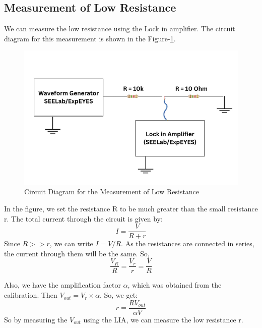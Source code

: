 \documentclass{article}
\begin{document}
\begin{multicols}{2}
\subsection{Measurement of Low Resistance}
We can measure the low resistance using the Lock in amplifier. The circuit diagram for this measurement is shown in the Figure-\ref{circuit_LR}. 



\begin{figure}[H]
    \centering
    \includegraphics[width=\columnwidth]{Images/circuit_LR.png}
    \caption{Circuit Diagram for the Measurement of Low Resistance}
    \label{circuit_LR}
\end{figure}

In the figure, we set the resistance R to be much greater than the small resistance r. The total current through the circuit is given by:
\begin{equation}
    I = \frac{V}{R+r}
\end{equation}
Since $R>>r$, we can write $I=V/R$. As the resistances are connected in series, the current through them will be the same. So,
\begin{equation}
    \frac{V_R}{R} = \frac{V_r}{r} = \frac{V}{R}
\end{equation}


Also, we have the amplification factor $\alpha$, which was obtained from the calibration. Then $V_{out}=V_r \times \alpha$. So, we get:
\begin{equation}
    r = \frac{RV_{out}}{\alpha V}
    \label{LR_eqn}
\end{equation}
So by measuring the $V_{out}$ using the LIA, we can measure the low resistance r.




\end{multicols}
\end{document}
